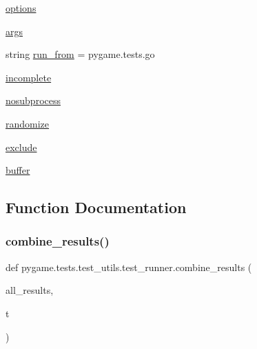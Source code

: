 \begin{DoxyCompactItemize}
\item 
\hyperlink{namespacepygame_1_1tests_1_1test__utils_1_1test__runner_a586fba3f729e0e91f5e0530cf97cd858}{options}
\item 
\hyperlink{namespacepygame_1_1tests_1_1test__utils_1_1test__runner_ad21d8227cd00eebc517b96434e7300a7}{args}
\item 
string \hyperlink{namespacepygame_1_1tests_1_1test__utils_1_1test__runner_a812a9e61da58e21d3084fe14c126a5b1}{run\+\_\+from} = \textquotesingle{}pygame.\+tests.\+go\textquotesingle{}
\item 
\hyperlink{namespacepygame_1_1tests_1_1test__utils_1_1test__runner_aace67231de4b84a3b92334013269c6d2}{incomplete}
\item 
\hyperlink{namespacepygame_1_1tests_1_1test__utils_1_1test__runner_ae8b8a8972b418fd0df5e91433bbef20b}{nosubprocess}
\item 
\hyperlink{namespacepygame_1_1tests_1_1test__utils_1_1test__runner_a84c34040546c62967b1fb2f26ebb78c2}{randomize}
\item 
\hyperlink{namespacepygame_1_1tests_1_1test__utils_1_1test__runner_a816e2393565b0aed1ad014591e5476d9}{exclude}
\item 
\hyperlink{namespacepygame_1_1tests_1_1test__utils_1_1test__runner_a71f20b66bf26ab22135148a6fc3fba3b}{buffer}
\end{DoxyCompactItemize}


\subsection{Function Documentation}
\mbox{\label{namespacepygame_1_1tests_1_1test__utils_1_1test__runner_ad000b73bd906940716d33735bdbad726}} 
\subsubsection{\texorpdfstring{combine\+\_\+results()}{combine\_results()}}
{\footnotesize\ttfamily def pygame.\+tests.\+test\+\_\+utils.\+test\+\_\+runner.\+combine\+\_\+results (\begin{DoxyParamCaption}\item[{}]{all\+\_\+results,  }\item[{}]{t }\end{DoxyParamCaption})}

